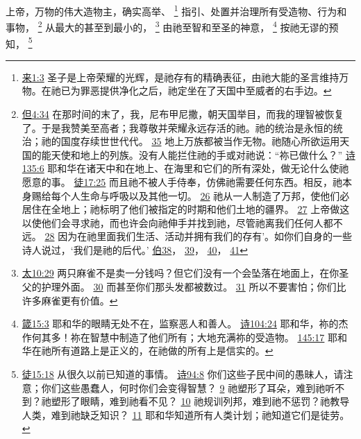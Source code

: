 \documentclass[12pt, a4paper, oneside]{ctexart}
\newcounter{parnum}[section]
\newcommand{\N}{%
   \noindent\refstepcounter{parnum}%
    \makebox[\parindent][l]{\textbf{\arabic{parnum}.}}}
\begin{document}
\N 上帝，万物的伟大造物主，确实高举、
	\footnote {
		\href{https://biblehub.com/hebrews/1-3.htm}{来1:3} 圣子是上帝荣耀的光辉，是祂存有的精确表征，由祂大能的圣言维持万物。在祂已为罪恶提供净化之后，祂定坐在了天国中至威者的右手边。
	}
	指引、处置并治理所有受造物、行为和事物，
	\footnote {
		\href{https://biblehub.com/daniel/4-34.htm}{但4:34} 在那时间的末了，我，尼布甲尼撒，朝天国举目，而我的理智被恢复了。于是我赞美至高者；我尊敬并荣耀永远存活的祂。祂的统治是永恒的统治；祂的国度存续世世代代。
		\href{https://biblehub.com/daniel/4-35.htm}{35} 地上万族都被当作无物。祂随心所欲运用天国的能天使和地上的列族。没有人能拦住祂的手或对祂说：“祢已做什么？”
		\href{https://biblehub.com/psalms/135-6.htm}{诗135:6} 耶和华在诸天中和在地上、在海里和它们的所有深处，做无论什么使祂愿意的事。
		\href{https://biblehub.com/acts/17-25.htm}{徒17:25} 而且祂不被人手侍奉，仿佛祂需要任何东西。相反，祂本身赐给每个人生命与呼吸以及其他一切。
		\href{https://biblehub.com/acts/17-26.htm}{26} 祂从一人制造了万邦，使他们必居住在全地上；祂标明了他们被指定的时期和他们土地的疆界。
		\href{https://biblehub.com/acts/17-27.htm}{27} 上帝做这以使他们会寻求祂，而也许会向祂伸手并找到祂，尽管祂离我们任何人都不远。
		\href{https://biblehub.com/acts/17-28.htm}{28} 因为在祂里面我们生活、活动并拥有我们的存有’。如你们自身的一些诗人说过，‘我们是祂的后代。’
		\href{https://biblehub.com/niv/job/38.htm}{伯38}，
		\href{https://biblehub.com/niv/job/39.htm}{39}，
		\href{https://biblehub.com/niv/job/40.htm}{40}，
		\href{https://biblehub.com/niv/job/41.htm}{41}
	}
	从最大的甚至到最小的，
	\footnote {
		\href{https://biblehub.com/matthew/10-29.htm}{太10:29} 两只麻雀不是卖一分钱吗？但它们没有一个会坠落在地面上，在你圣父的护理外面。
		\href{https://biblehub.com/matthew/10-30.htm}{30} 而甚至你们那头发都被数过。
		\href{https://biblehub.com/matthew/10-31.htm}{31} 所以不要害怕；你们比许多麻雀更有价值。
	}
	由祂至智和至圣的神意，
	\footnote {
		\href{https://biblehub.com/proverbs/15-3.htm}{箴15:3} 耶和华的眼睛无处不在，监察恶人和善人。
		\href{https://biblehub.com/psalms/104-24.htm}{诗104:24} 耶和华，祢的杰作何其多！祢在智慧中制造了他们所有；大地充满祢的受造物。
		\href{https://biblehub.com/psalms/145-17.htm}{145:17} 耶和华在祂所有道路上是正义的，在祂做的所有上是信实的。
	}
	按祂无谬的预知，
	\footnote {
		\href{https://biblehub.com/acts/15-18.htm}{徒15:18} 从很久以前已知道的事情。
		\href{https://biblehub.com/psalms/94-8.htm}{诗94:8} 你们这些子民中间的愚昧人，请注意；你们这些愚蠢人，何时你们会变得智慧？
		\href{https://biblehub.com/psalms/94-9.htm}{9} 祂塑形了耳朵，难到祂听不到？祂塑形了眼睛，难到祂看不见？
		\href{https://biblehub.com/psalms/94-10.htm}{10} 祂规训列邦，难到祂不惩罚？祂教导人类，难到祂缺乏知识？
		\href{https://biblehub.com/psalms/94-11.htm}{11} 耶和华知道所有人类计划；祂知道它们是徒劳。
	}
\end{document}
